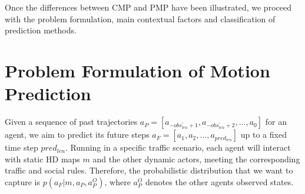 \begin{comment}
Under such frameworks, the \acs{ADS} can reason over potential actions while considering its influence on surrounding agents, as observed in Figure \ref{fig:chapter_2_related_works/cmp_vs_pmp}, inducing less conservative and more efficient maneuvers in highly interactive scenarios. \cite{huang2023conditional} propose a learning-based behaviour planning framework that learns to predict conditional multi-agent future trajectories, evaluating decisions from real-world human data. Moreover, they propose a two-stage learning process where the prediction model is trained first conditioned on the \ac{ADS} future actions, and then used as an environment model in the learning of the cost function with maximum entropy Inverse Reinforcement Learning (IRL). \cite{tang2022interventional} argue that CMP-based models essentially learns the posterior distribution of future trajectories conditioned on the future states of the ego-vehicle, where this future trajectory is treated as an observation, whilst safe and realistic prediction models should build the \ac{MP} to approximate the future trajectory distribution under the intervention of enforcing the \ac{ADS} future states, referring this new task as Interventional Behaviour Prediction (IBP). As aforementioned, the algorithms studied and developed throughout this thesis do not focus on the joint study of the prediction and behaviour planning modules, but on building efficient and powerful \ac{PMP} algorithms without considering the future states of the autonomous agents as an additional condition. 
\end{comment}
	
Once the differences between \ac{CMP} and \ac{PMP} have been illustrated, we proceed with the problem formulation, main contextual factors and classification of prediction methods.

\section{Problem Formulation of Motion Prediction}
\label{sec:2_problem_formulation_mp}

Given a sequence of past trajectories $a_{P}=[a_{-obs_{len}^{'}+1},a_{-obs_{len}^{'}+2},...,a_{0}]$ for an agent, we aim to predict its future steps $a_{F}=[a_{1},a_{2},...,a_{pred_{len}}]$ up to a fixed time step $pred_{len}$. Running in a specific traffic scenario, each agent will interact with static HD maps $m$ and the other dynamic actors, meeting the corresponding traffic and social rules. Therefore, the probabilistic distribution that we want to capture is $p(a_F|m, a_P, a^O_P)$, where $a^O_P$ denotes the other agents observed states. 

